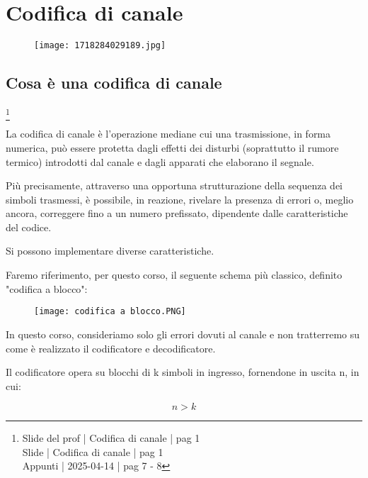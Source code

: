 \chapter{Codifica di canale}

\begin{figure}[h]
    \centering
    \texttt{[image: 1718284029189.jpg]}
\end{figure}

\newpage 

\section{Cosa è una codifica di canale}
\footnote{Slide del prof | Codifica di canale | pag 1 \\ 
Slide | Codifica di canale | pag  1\\
Appunti | 2025-04-14 | pag 7 - 8
} 

La codifica di canale è l'operazione mediane cui una trasmissione, in forma numerica, 
può essere protetta dagli effetti dei disturbi (soprattutto il rumore termico) introdotti dal canale e dagli apparati che elaborano il segnale. \newline 

Più precisamente, attraverso una opportuna strutturazione della sequenza dei simboli trasmessi, 
è possibile, in reazione, rivelare la presenza di errori o, meglio ancora, correggere fino a un numero prefissato, 
dipendente dalle caratteristiche del codice. \newline 

Si possono implementare diverse caratteristiche. \newline 

Faremo riferimento, per questo corso, il seguente schema più classico, definito "codifica a blocco": 

\begin{figure}[h]
    \centering
    \texttt{[image: codifica a blocco.PNG]}
\end{figure}

\begin{tcolorbox}
In questo corso, consideriamo solo gli errori dovuti al canale e non tratterremo su come è realizzato il codificatore e decodificatore.     
\end{tcolorbox}

Il codificatore opera su blocchi di k simboli in ingresso,
fornendone in uscita n, 
in cui: 

{
    \Large 
    \begin{equation}
        n > k 
    \end{equation}
}

